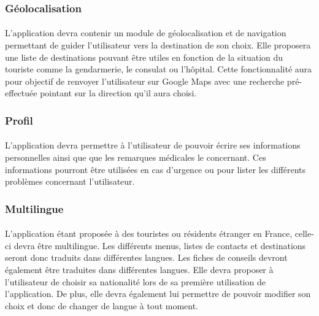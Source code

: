\subsubsection{Géolocalisation}
	\paragraph{}
			L'application devra contenir un module de géolocalisation et de navigation permettant de guider l'utilisateur vers la destination de son choix. Elle proposera une liste de destinations pouvant être utiles en fonction de la situation du touriste comme la gendarmerie, le consulat ou l'hôpital. Cette fonctionnalité aura pour objectif de renvoyer l'utilisateur sur Google Maps avec une recherche pré-effectuée pointant sur la direction qu'il aura choisi.
			
\subsubsection{Profil}
	\paragraph{}
			L'application devra permettre à l'utilisateur de pouvoir écrire ses informations personnelles ainsi que que les remarques médicales le concernant. Ces informations pourront être utilisées en cas d'urgence ou pour lister les différents problèmes concernant l'utilisateur.
			
\subsubsection{Multilingue}
	\paragraph{}
			L'application étant proposée à des touristes ou résidents étranger en France, celle-ci devra être multilingue. Les différents menus, listes de contacts et destinations seront donc traduits dans différentes langues. Les fiches de conseils devront également être traduites dans différentes langues. Elle devra proposer à l'utilisateur de choisir sa nationalité lors de sa première utilisation de l'application. De plus, elle devra également lui permettre de pouvoir modifier son choix et donc de changer de langue à tout moment.
			
			